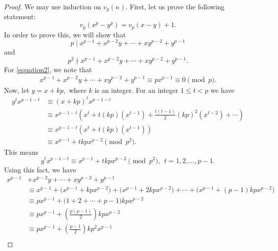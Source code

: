 \documentclass[main.tex]{subfile}
\begin{document}
    \begin{proof}
        We may use induction on $v_p(n).$ First, let us prove the following statement:
            \begin{equation}\label{equation1}
                v_p(  x^p - y^p ) = v_p  ( x - y ) + 1.
            \end{equation}
        In order to prove this, we will show that
            \begin{equation}\label{equation2}
                p \mid x^{p-1}+x^{p-2}y+\cdots+xy^{p-2}+y^{p-1}
            \end{equation}
        and
            \begin{equation}\label{equation3}
                p^2 \nmid x^{p-1}+x^{p-2}y+\cdots+xy^{p-2}+y^{p-1}.
            \end{equation}
        For \eqref{equation2}, we note that
        \begin{align*}
        x^{p-1}+x^{p-2}y+\cdots+xy^{p-2}+y^{p-1} \equiv px^{p-1} \equiv 0 \pmod p .
        \end{align*}
        Now, let $y=x+kp,$ where $k$ is an integer. For an integer $ 1  \leq t <p$ we have
            \begin{align*}
                y^t x^{p-1-t} & \equiv (x+kp)^t x^{p-1-t} \\
                & \equiv x^{p-1-t} \left( x^t + t(kp)(x^{t-1})+ \frac{t(t-1)}{2} (kp)^2 (x^{t-2}) +\cdots \right) \\
                & \equiv x^{p-1-t} \left( x^t + t(kp)(x^{t-1}) \right) \\
                & \equiv x^{p-1}+tkpx^{p-2} \pmod{p^2}.
            \end{align*}
        This means
            \[
            y^t x^{p-1-t} \equiv x^{p-1}+tkpx^{p-2} \pmod{p^2}, \ \ t=1,2,\ldots,p-1.
            \]
        Using this fact, we have
            \begin{align*}
                x^{p-1}& +x^{p-2}y+\cdots+xy^{p-2}+y^{p-1} \\
                & \equiv x^{p-1}+\big(x^{p-1}+kpx^{p-2}\big)+\big(x^{p-1}+2kpx^{p-2}\big)+\cdots+\big(x^{p-1} +(p-1)kpx^{p-2}\big) \\
                & \equiv px^{p-1} + \big(1+2+\cdots+p-1\big)kpx^{p-2} \\
                & \equiv px^{p-1} + \left( \frac{p(p-1)}{2} \right) kpx^{p-2} \\
                & \equiv px^{p-1} + \left( \frac{p-1}{2} \right) kp^2x^{p-1} \\

\end{align*}
\end{proof}
\end{document}
